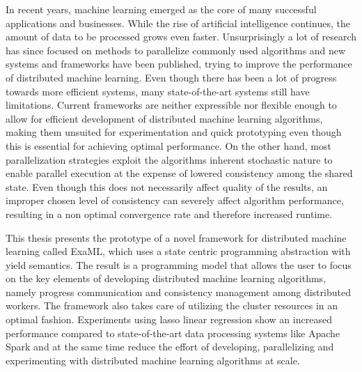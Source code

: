 % 
% 
%
In recent years, machine learning emerged as the core of many successful applications and businesses.
While the rise of artificial intelligence continues, the amount of data to be processed grows even faster.
Unsurprisingly a lot of research has since focused on methods to parallelize commonly used algorithms and new systems and frameworks have been published, trying to improve the performance of distributed machine learning.
Even though there has been a lot of progress towards more efficient systems, many state-of-the-art systems still have limitations.
Current frameworks are neither expressible nor flexible enough to allow for efficient development of distributed machine learning algorithms, making them unsuited for experimentation and quick prototyping even though this is essential for achieving optimal performance.
On the other hand, most parallelization strategies exploit the algorithms inherent stochastic nature to enable parallel execution at the expense of lowered consistency among the shared state.
Even though this does not necessarily affect quality of the results, an improper chosen level of consistency can severely affect algorithm performance, resulting in a non optimal convergence rate and therefore increased runtime.

This thesis presents the prototype of a novel framework for distributed machine learning called ExaML, which uses a state centric programming abstraction with yield semantics.
The result is a programming model that allows the user to focus on the key elements of developing distributed machine learning algorithms, namely progress communication and consistency management among distributed workers.
The framework also takes care of utilizing the cluster resources in an optimal fashion.
Experiments using lasso linear regression show an increased performance compared to state-of-the-art data processing systems like Apache Spark and at the same time reduce the effort of developing, parallelizing and experimenting with distributed machine learning algorithms at scale.
